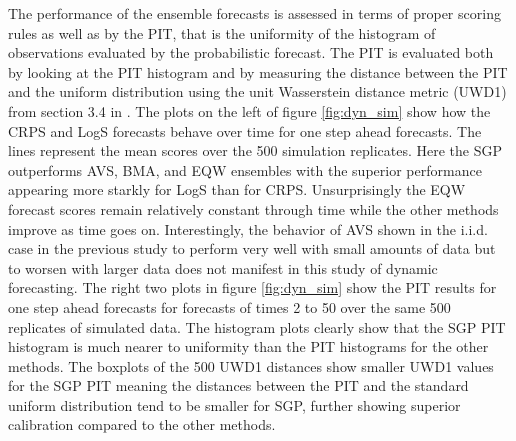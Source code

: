 The performance of the ensemble forecasts is assessed in terms of proper 
scoring rules as well as by the PIT, that is the uniformity of the histogram 
of observations evaluated by the probabilistic forecast. The PIT is evaluated 
both by looking at the PIT histogram and by measuring the distance between the 
PIT and the uniform distribution using the unit Wasserstein distance metric 
(UWD1) from section 3.4 in \cite{wadsworth2025quantile}.
The plots on the left of figure \ref{fig:dyn_sim} show how the CRPS and LogS 
forecasts behave over time for one step ahead forecasts. 
The lines represent the mean scores over the 500 
simulation replicates. Here the SGP outperforms AVS, BMA, and EQW ensembles 
with the superior performance appearing more starkly for LogS than for CRPS. 
Unsurprisingly the EQW forecast scores remain relatively constant through time 
while the other methods improve as time goes on. Interestingly, the behavior 
of AVS shown in the i.i.d. case in the previous study to perform very well 
with small amounts of data but to worsen with larger data does not manifest 
in this study of dynamic forecasting.
The right two plots in figure \ref{fig:dyn_sim} show 
the PIT results for one step ahead forecasts for forecasts of times 2 to 50 
over the same 500 replicates of simulated data. The histogram plots clearly 
show that the
SGP PIT histogram is much nearer to uniformity than the PIT histograms for the 
other methods. The boxplots of the 500 UWD1 distances show smaller UWD1 values 
for the SGP PIT meaning the distances between the PIT and the standard uniform 
distribution tend to be smaller for SGP, further showing superior calibration 
compared to the other methods.



